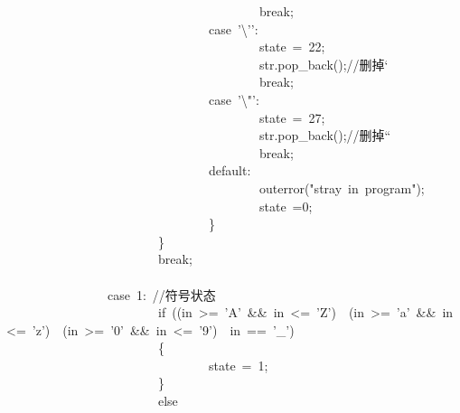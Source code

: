 \documentclass{article}
\begin{document}
\begin{mdpre}
~~~~~~~~~~~~~~~~~~~~~~~~~~~~~~~~~~~~~~~~{break};\\
~~~~~~~~~~~~~~~~~~~~~~~~~~~~~~~~{case}~{'}{\textbackslash{}'}{'}:\\
~~~~~~~~~~~~~~~~~~~~~~~~~~~~~~~~~~~~~~~~state~=~{22};\\
~~~~~~~~~~~~~~~~~~~~~~~~~~~~~~~~~~~~~~~~str.pop\_back();{//删掉‘}\\
~~~~~~~~~~~~~~~~~~~~~~~~~~~~~~~~~~~~~~~~{break};\\
~~~~~~~~~~~~~~~~~~~~~~~~~~~~~~~~{case}~{'}{\textbackslash{}"}{'}:\\
~~~~~~~~~~~~~~~~~~~~~~~~~~~~~~~~~~~~~~~~state~=~{27};\\
~~~~~~~~~~~~~~~~~~~~~~~~~~~~~~~~~~~~~~~~str.pop\_back();{//删掉“}\\
~~~~~~~~~~~~~~~~~~~~~~~~~~~~~~~~~~~~~~~~{break};\\
~~~~~~~~~~~~~~~~~~~~~~~~~~~~~~~~{default}:\\
~~~~~~~~~~~~~~~~~~~~~~~~~~~~~~~~~~~~~~~~outerror({"}{stray~in~program}{"});\\
~~~~~~~~~~~~~~~~~~~~~~~~~~~~~~~~~~~~~~~~state~={0};\\
~~~~~~~~~~~~~~~~~~~~~~~~~~~~~~~~\}\\
~~~~~~~~~~~~~~~~~~~~~~~~\}\\
~~~~~~~~~~~~~~~~~~~~~~~~{break};\\
\\
~~~~~~~~~~~~~~~~{case}~{1}:~{//符号状态}\\
~~~~~~~~~~~~~~~~~~~~~~~~{if}~((in~\textgreater{}=~{'A'}~\&\&~in~\textless{}=~{'Z'})~\textbar{}\textbar{}~(in~\textgreater{}=~{'a'}~\&\&~in~\textless{}=~{'z'})~\textbar{}\textbar{}~(in~\textgreater{}=~{'0'}~\&\&~in~\textless{}=~{'9'})~\textbar{}\textbar{}~in~==~{'\_'})\\
~~~~~~~~~~~~~~~~~~~~~~~~\{\\
~~~~~~~~~~~~~~~~~~~~~~~~~~~~~~~~state~=~{1};\\
~~~~~~~~~~~~~~~~~~~~~~~~\}\\
~~~~~~~~~~~~~~~~~~~~~~~~{else}\\

\end{mdpre}
\end{document}
